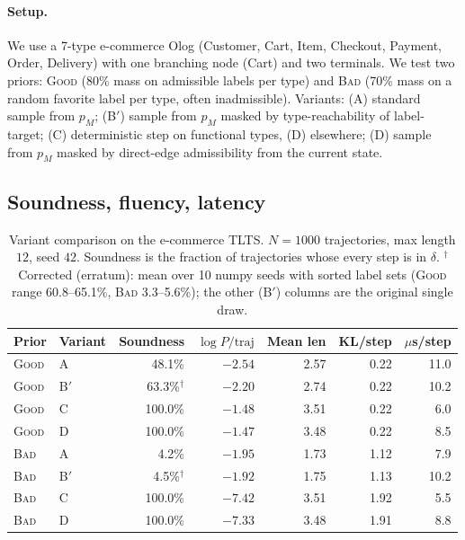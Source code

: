 \documentclass[preprint]{nesy2026}
\begin{document}
\paragraph{Setup.} We use a 7-type e-commerce Olog (Customer, Cart,
Item, Checkout, Payment, Order, Delivery) with one branching node
(Cart) and two terminals. We test two priors: \textsc{Good} (80\%
mass on admissible labels per type) and \textsc{Bad} (70\% mass on a
random favorite label per type, often inadmissible). Variants:
(A) standard sample from $p_M$; (B$'$) sample from $p_M$ masked by
type-reachability of label-target; (C) deterministic step on
functional types, (D) elsewhere; (D) sample from $p_M$ masked by
direct-edge admissibility from the current state.

\subsection{Soundness, fluency, latency}

\begin{table}[h]
\centering
\small
\begin{tabular}{@{}llrrrrr@{}}
\toprule
Prior & Variant & Soundness & $\log P/\text{traj}$ & Mean len &
KL/step & $\mu$s/step \\
\midrule
\textsc{Good} & A   &  48.1\% & $-2.54$ & 2.57 & 0.22 & 11.0 \\
\textsc{Good} & B$'$ & 63.3\%$^\dagger$ & $-2.20$ & 2.74 & 0.22 & 10.2 \\
\textsc{Good} & C   & 100.0\% & $-1.48$ & 3.51 & 0.22 &  6.0 \\
\textsc{Good} & D   & 100.0\% & $-1.47$ & 3.48 & 0.22 &  8.5 \\
\midrule
\textsc{Bad}  & A   &   4.2\% & $-1.95$ & 1.73 & 1.12 &  7.9 \\
\textsc{Bad}  & B$'$ &  4.5\%$^\dagger$ & $-1.92$ & 1.75 & 1.13 & 10.2 \\
\textsc{Bad}  & C   & 100.0\% & $-7.42$ & 3.51 & 1.92 &  5.5 \\
\textsc{Bad}  & D   & 100.0\% & $-7.33$ & 3.48 & 1.91 &  8.8 \\
\bottomrule
\end{tabular}
\caption{Variant comparison on the e-commerce TLTS. $N{=}1000$
trajectories, max length $12$, seed $42$. Soundness is the fraction
of trajectories whose every step is in $\delta$. $^\dagger$Corrected (erratum): mean over 10 numpy seeds with sorted label sets (\textsc{Good} range 60.8--65.1\%, \textsc{Bad} 3.3--5.6\%); the other (B$'$) columns are the original single draw.}
\label{tab:variants}
\end{table}
\end{document}
